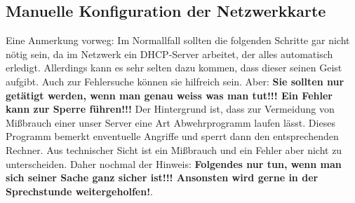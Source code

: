 \subsection{Manuelle Konfiguration der Netzwerkkarte}
Eine Anmerkung vorweg: Im Normallfall sollten die folgenden Schritte
gar nicht nötig sein, da im Netzwerk ein DHCP-Server arbeitet, der
alles automatisch erledigt. Allerdings kann es sehr selten dazu
kommen, dass dieser seinen Geist aufgibt. Auch zur Fehlersuche können
sie hilfreich sein. Aber: \textbf{\Large Sie sollten nur getätigt werden, wenn man
genau weiss was man tut!!! Ein Fehler kann zur Sperre führen!!!} Der
Hintergrund ist, dass zur Vermeidung von Mißbrauch einer unser Server
eine Art Abwehrprogramm laufen lässt. Dieses Programm bemerkt
 enventuelle Angriffe und sperrt dann den entsprechenden
Rechner. Aus technischer Sicht ist ein Mißbrauch und ein Fehler aber
nicht zu unterscheiden. Daher nochmal der Hinweis: \textbf{\Large Folgendes nur
  tun, wenn man sich seiner Sache ganz sicher ist!!! Ansonsten wird
  gerne in der Sprechstunde weitergeholfen!}.\\\\

